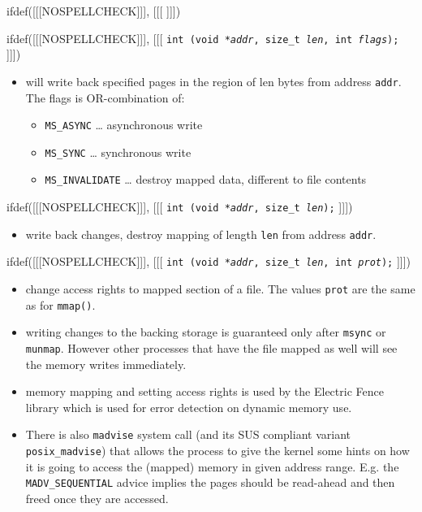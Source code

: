 
ifdef([[[NOSPELLCHECK]]], [[[
]]])

\begin{slide}
ifdef([[[NOSPELLCHECK]]], [[[
\texttt{int (void *\emph{addr}, size\_t \emph{l{}en},
int \emph{flags});}
]]])
\begin{itemize}
\item will write back specified pages in the region of l{}en bytes from address
\texttt{addr}. The flags is OR-combination of:
    \begin{itemize}
    \item \texttt{MS\_ASYNC} \dots{} asynchronous write
    \item \texttt{MS\_SYNC} \dots{} synchronous write
    \item \texttt{MS\_INVALIDATE} \dots{} destroy mapped data,
    different to file contents
    \end{itemize}
\end{itemize}
ifdef([[[NOSPELLCHECK]]], [[[
\texttt{int (void *\emph{addr}, size\_t \emph{l{}en});}
]]])
\begin{itemize}
\item write back changes, destroy mapping of length \texttt{l{}en} from
address \texttt{addr}.
\end{itemize}
ifdef([[[NOSPELLCHECK]]], [[[
\texttt{int (void *\emph{addr}, size\_t \emph{l{}en},
int \emph{prot});}
]]])
\begin{itemize}
\item change access rights to mapped section of a file. The values
\texttt{prot} are the same as for \texttt{mmap()}.
\end{itemize}
\end{slide}

\begin{itemize}
\item writing changes to the backing storage is guaranteed only after
\texttt{msync} or \texttt{munmap}.  However other processes that have the file
mapped as well will see the memory writes immediately.
\item memory mapping and setting access rights is used by the Electric Fence
library which is used for error detection on dynamic memory use.
\item There is also \texttt{madvise} system call (and its SUS compliant variant
\texttt{posix\_madvise}) that allows the process to give the kernel some hints
on how it is going to access the (mapped) memory in given address range.
E.g. the \texttt{MADV\_SEQUENTIAL} advice implies the pages should be read-ahead
and then freed once they are accessed.
\end{itemize}

